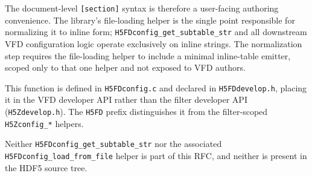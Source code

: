 \documentclass[../RFC-HDFG-2026-001.tex]{subfiles}
\begin{document}
The document-level \texttt{[section]} syntax is therefore a user-facing
authoring convenience.  The library's file-loading helper is the single point
responsible for normalizing it to inline form; \texttt{H5FDconfig\_get\_subtable\_str}
and all downstream VFD configuration logic operate exclusively on inline
strings.  The normalization step requires the file-loading helper to include a
minimal inline-table emitter, scoped only to that one helper and not exposed
to VFD authors.

This function is defined in \texttt{H5FDconfig.c} and declared in
\texttt{H5FDdevelop.h}, placing it in the VFD developer API rather than the
filter developer API (\texttt{H5Zdevelop.h}).  The \texttt{H5FD} prefix
distinguishes it from the filter-scoped \texttt{H5Zconfig\_*} helpers.

\noindent Neither \texttt{H5FDconfig\_get\_subtable\_str} nor the associated
\texttt{H5FDconfig\_load\_from\_file} helper is part of this RFC, and neither is
present in the HDF5 source tree.
\end{document}
